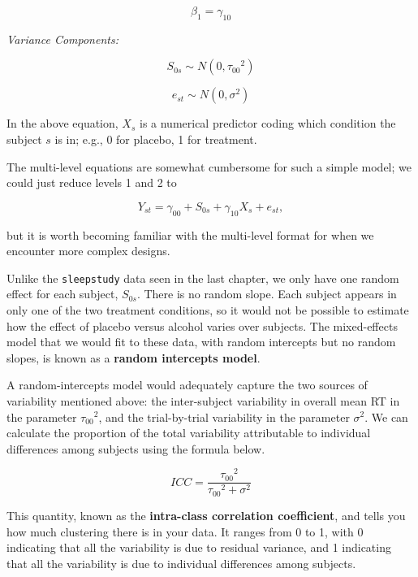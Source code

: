 \documentclass[]{book}
\begin{document}
\begin{equation}
\beta_{1} = \gamma_{10}
\end{equation}

\emph{Variance Components:}

\begin{equation}
S_{0s} \sim N\left(0, {\tau_{00}}^2\right) 
\end{equation}

\begin{equation}
e_{st} \sim N\left(0, \sigma^2\right)
\end{equation}

In the above equation, \(X_s\) is a numerical predictor coding which condition the subject \(s\) is in; e.g., 0 for placebo, 1 for treatment.

The multi-level equations are somewhat cumbersome for such a simple model; we could just reduce levels 1 and 2 to

\begin{equation}
Y_{st} = \gamma_{00} + S_{0s} + \gamma_{10} X_s + e_{st},
\end{equation}

but it is worth becoming familiar with the multi-level format for when we encounter more complex designs.

Unlike the \texttt{sleepstudy} data seen in the last chapter, we only have one random effect for each subject, \(S_{0s}\). There is no random slope. Each subject appears in only one of the two treatment conditions, so it would not be possible to estimate how the effect of placebo versus alcohol varies over subjects. The mixed-effects model that we would fit to these data, with random intercepts but no random slopes, is known as a \textbf{random intercepts model}.

A random-intercepts model would adequately capture the two sources of variability mentioned above: the inter-subject variability in overall mean RT in the parameter \({\tau_{00}}^2\), and the trial-by-trial variability in the parameter \(\sigma^2\). We can calculate the proportion of the total variability attributable to individual differences among subjects using the formula below.

\[ICC = \frac{{\tau_{00}}^2}{{\tau_{00}}^2 + \sigma^2}\]

This quantity, known as the \textbf{intra-class correlation coefficient}, and tells you how much clustering there is in your data. It ranges from 0 to 1, with 0 indicating that all the variability is due to residual variance, and 1 indicating that all the variability is due to individual differences among subjects.
\end{document}

